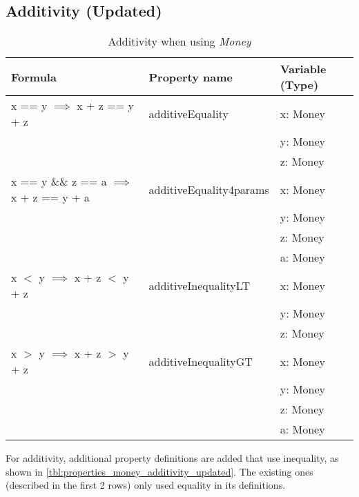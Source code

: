 \subsection*{Additivity (Updated)}
\label{ssct:properties_additivity_updated}
\begin{table}[!ht]
\centering
\begin{tabular}{lll}
\hline
                        \textbf{Formula}                             & \textbf{Property name}  & \textbf{Variable (Type)} \\ \hline
\rowcolor[HTML]{EFEFEF} x == y $\implies$ x + z == y + z             & additiveEquality        & x: Money                 \\
\rowcolor[HTML]{EFEFEF}                                              &                         & y: Money                 \\
\rowcolor[HTML]{EFEFEF}                                              &                         & z: Money                 \\
                        x == y \&\& z == a $\implies$ x + z == y + a & additiveEquality4params & x: Money                 \\
                                                                     &                         & y: Money                 \\
                                                                     &                         & z: Money                 \\
                                                                     &                         & a: Money                 \\
\rowcolor[HTML]{EFEFEF} x $<$ y $\implies$ x + z $<$ y + z           & additiveInequalityLT    & x: Money                 \\
\rowcolor[HTML]{EFEFEF}                                              &                         & y: Money                 \\
\rowcolor[HTML]{EFEFEF}                                              &                         & z: Money                 \\
                        x $>$ y $\implies$ x + z $>$ y + z           & additiveInequalityGT    & x: Money                 \\
                                                                     &                         & y: Money                 \\
                                                                     &                         & z: Money                 \\
                                                                     &                         & a: Money                 \\ \hline
\end{tabular}
\caption{Additivity when using \textit{Money}}
\label{tbl:properties_money_additivity_updated}
\end{table}
\FloatBarrier
For additivity, additional property definitions are added that use inequality,
as shown in \autoref{tbl:properties_money_additivity_updated}. The existing ones
(described in the first 2 rows) only used equality in its definitions.

